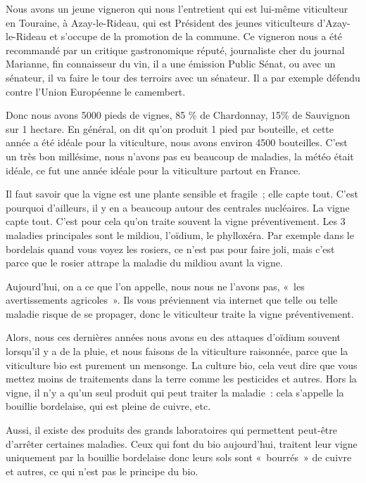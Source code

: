 \documentclass[a4paper, titlepage]{report}
\begin{document}
Nous avons un jeune vigneron qui nous l'entretient qui est lui-même
viticulteur en Touraine, à Azay-le-Rideau, qui est Président des jeunes
viticulteurs d'Azay-le-Rideau et s'occupe de la promotion de la commune.
Ce vigneron nous a été recommandé par un critique gastronomique réputé,
journaliste cher du journal Marianne, fin connaisseur du vin, il a une émission Public Sénat, ou avec un sénateur, il va faire le tour des
terroirs avec un sénateur. Il a par exemple défendu contre l'Union
Européenne le camembert.

Donc nous avons 5000 pieds de vignes, 85 \% de Chardonnay, 15\% de
Sauvignon sur 1 hectare. En général, on dit qu'on produit 1 pied par
bouteille, et cette année a été idéale pour la viticulture, nous avons
environ 4500 bouteilles. C'est un très bon millésime, nous n'avons pas
eu beaucoup de maladies, la météo était idéale, ce fut une année idéale
pour la viticulture partout en France.

Il faut savoir que la vigne est une plante sensible et fragile~; elle
capte tout. C'est pourquoi d'ailleurs, il y en a beaucoup autour des
centrales nucléaires. La vigne capte tout. C'est pour cela qu'on traite
souvent la vigne préventivement. Les 3 maladies principales sont le
mildiou, l'oïdium, le phylloxéra. Par exemple dans le bordelais quand
vous voyez les rosiers, ce n'est pas pour faire joli, mais c'est parce
que le rosier attrape la maladie du mildiou avant la vigne.

Aujourd'hui, on a ce que l'on appelle, nous nous ne l'avons pas, «~les
avertissements agricoles~». Ils vous préviennent via internet que telle
ou telle maladie risque de se propager, donc le viticulteur traite la
vigne préventivement.

Alors, nous ces dernières années nous avons eu des attaques d'oïdium
souvent lorsqu'il y a de la pluie, et nous faisons de la viticulture
raisonnée, parce que la viticulture bio est purement un mensonge. La
culture bio, cela veut dire que vous mettez moins de traitements dans la
terre comme les pesticides et autres. Hors la vigne, il n'y a qu'un seul
produit qui peut traiter la maladie~: cela s'appelle la bouillie bordelaise,
qui est pleine de cuivre, etc.

Aussi, il existe des produits des grands laboratoires qui permettent
peut-être d'arrêter certaines maladies. Ceux qui font du bio
aujourd'hui, traitent leur vigne uniquement par la bouillie bordelaise
donc leurs sols sont «~bourrés~» de cuivre et autres, ce qui n'est pas
le principe du bio.
\end{document}
